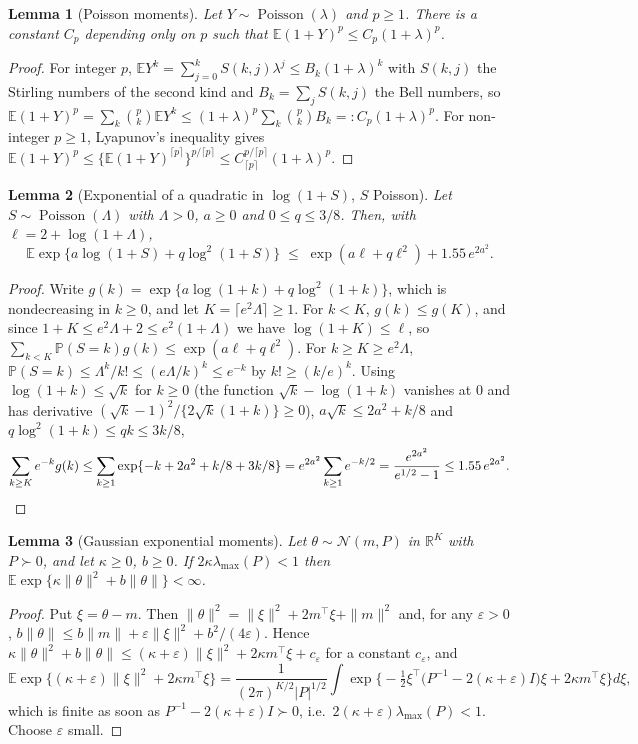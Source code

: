 \documentclass[12pt]{article}
\theoremstyle{plain}
\newtheorem{lemma}{Lemma}
\theoremstyle{definition}
\theoremstyle{remark}
\newcommand{\R}{\mathbb{R}}
\newcommand{\E}{\mathbb{E}}
\newcommand{\Prob}{\mathbb{P}}
\newcommand{\calN}{\mathcal{N}}
\newcommand{\Pois}{\operatorname{Poisson}}
\newcommand{\T}{^{\top}}
\begin{document}
\begin{lemma}[Poisson moments]\label{lem:poismom}
Let $Y\sim\Pois(\lambda)$ and $p\ge1$. There is a constant $C_p$ depending only on $p$ such that $\E(1+Y)^p\le C_p(1+\lambda)^p$.
\end{lemma}
\begin{proof}
For integer $p$, $\E Y^k=\sum_{j=0}^kS(k,j)\lambda^j\le B_k(1+\lambda)^k$ with $S(k,j)$ the Stirling numbers of the second kind and $B_k=\sum_jS(k,j)$ the Bell numbers, so $\E(1+Y)^p=\sum_k\binom pk\E Y^k\le(1+\lambda)^p\sum_k\binom pkB_k=:C_p(1+\lambda)^p$. For non-integer $p\ge1$, Lyapunov's inequality gives $\E(1+Y)^p\le\{\E(1+Y)^{\lceil p\rceil}\}^{p/\lceil p\rceil}\le C_{\lceil p\rceil}^{p/\lceil p\rceil}(1+\lambda)^p$.
\end{proof}

\begin{lemma}[Exponential of a quadratic in $\log(1+S)$, $S$ Poisson]\label{lem:poisexp}
Let $S\sim\Pois(\Lambda)$ with $\Lambda>0$, $a\ge0$ and $0\le q\le3/8$. Then, with $\ell=2+\log(1+\Lambda)$,
\[
\E\exp\big\{a\log(1+S)+q\log^2(1+S)\big\}\;\le\;\exp(a\ell+q\ell^2)+1.55\,e^{2a^2}.
\]
\end{lemma}
\begin{proof}
Write $g(k)=\exp\{a\log(1+k)+q\log^2(1+k)\}$, which is nondecreasing in $k\ge0$, and let $K=\lceil e^2\Lambda\rceil\ge1$. For $k<K$, $g(k)\le g(K)$, and since $1+K\le e^2\Lambda+2\le e^2(1+\Lambda)$ we have $\log(1+K)\le\ell$, so $\sum_{k<K}\Prob(S=k)g(k)\le\exp(a\ell+q\ell^2)$. For $k\ge K\ge e^2\Lambda$, $\Prob(S=k)\le\Lambda^k/k!\le(e\Lambda/k)^k\le e^{-k}$ by $k!\ge(k/e)^k$. Using $\log(1+k)\le\sqrt k$ for $k\ge0$ (the function $\sqrt k-\log(1+k)$ vanishes at $0$ and has derivative $(\sqrt k-1)^2/\{2\sqrt k(1+k)\}\ge0$), $a\sqrt k\le2a^2+k/8$ and $q\log^2(1+k)\le qk\le3k/8$,
\[
\sum_{k\ge K}e^{-k}g(k)\le\sum_{k\ge1}\exp\{-k+2a^2+k/8+3k/8\}=e^{2a^2}\sum_{k\ge1}e^{-k/2}=\frac{e^{2a^2}}{e^{1/2}-1}\le1.55\,e^{2a^2}. \qedhere
\]
\end{proof}

\begin{lemma}[Gaussian exponential moments]\label{lem:gauss}
Let $\theta\sim\calN(m,P)$ in $\R^K$ with $P\succ0$, and let $\kappa\ge0$, $b\ge0$. If $2\kappa\lambda_{\max}(P)<1$ then $\E\exp\{\kappa\|\theta\|^2+b\|\theta\|\}<\infty$.
\end{lemma}
\begin{proof}
Put $\xi=\theta-m$. Then $\|\theta\|^2=\|\xi\|^2+2m\T\xi+\|m\|^2$ and, for any $\varepsilon>0$, $b\|\theta\|\le b\|m\|+\varepsilon\|\xi\|^2+b^2/(4\varepsilon)$. Hence $\kappa\|\theta\|^2+b\|\theta\|\le(\kappa+\varepsilon)\|\xi\|^2+2\kappa m\T\xi+c_\varepsilon$ for a constant $c_\varepsilon$, and
\[
\E\exp\{(\kappa+\varepsilon)\|\xi\|^2+2\kappa m\T\xi\}=\frac{1}{(2\pi)^{K/2}|P|^{1/2}}\int\exp\Big\{-\tfrac12\xi\T\big(P^{-1}-2(\kappa+\varepsilon)I\big)\xi+2\kappa m\T\xi\Big\}d\xi ,
\]
which is finite as soon as $P^{-1}-2(\kappa+\varepsilon)I\succ0$, i.e.\ $2(\kappa+\varepsilon)\lambda_{\max}(P)<1$. Choose $\varepsilon$ small.
\end{proof}
\end{document}
